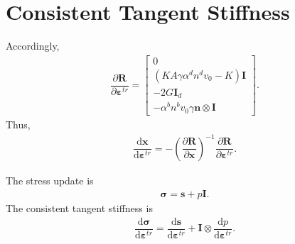 \documentclass[11pt,fleqn,3p]{elsarticle}
\newcommand*{\md}[1]{\mathrm{d}#1}
\newcommand*{\ddfrac}[2]{\dfrac{\md#1}{\md#2}}
\newcommand*{\pfrac}[2]{\dfrac{\partial#1}{\partial#2}}
\begin{document}
\section{Consistent Tangent Stiffness}
Accordingly,
\begin{gather*}
\pfrac{\mathbold{R}}{\mathbold{\varepsilon}^{tr}}=
\begin{bmatrix}
	0                                                    \\[3mm]
	\left(KA\gamma\alpha^dn^dv_0-K\right)\mathbold{I}    \\[3mm]
	-2G\mathbf{I}_{d}                                    \\[3mm]
	-\alpha^bn^bv_0\gamma\mathbold{n}\otimes\mathbold{I}
\end{bmatrix}.
\end{gather*}
Thus,
\begin{gather*}
\ddfrac{\mathbold{x}}{\mathbold{\varepsilon}^{tr}}=-\left(\pfrac{\mathbold{R}}{\mathbold{x}}\right)^{-1}\pfrac{\mathbold{R}}{\mathbold{\varepsilon}^{tr}}.
\end{gather*}

The stress update is
\begin{gather*}
\mathbold{\sigma}=\mathbold{s}+p\mathbold{I}.
\end{gather*}
The consistent tangent stiffness is
\begin{gather*}
\ddfrac{\mathbold{\sigma}}{\mathbold{\varepsilon}^{tr}}=\ddfrac{\mathbold{s}}{\mathbold{\varepsilon}^{tr}}+\mathbold{I}\otimes\ddfrac{p}{\mathbold{\varepsilon}^{tr}}.
\end{gather*}
\end{document}
